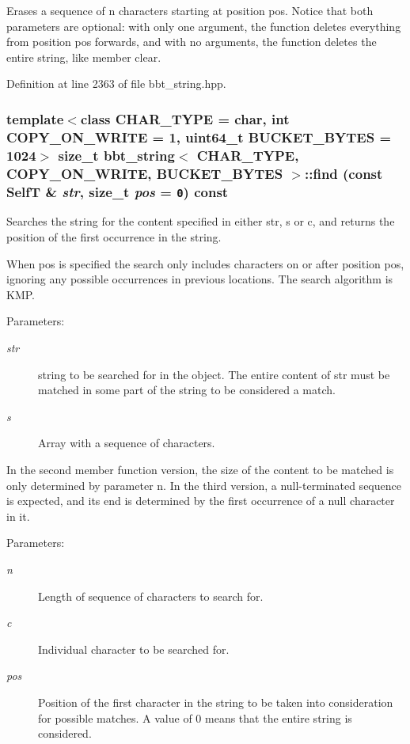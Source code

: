 Erases a sequence of n characters starting at position pos. Notice that both parameters are optional: with only one argument, the function deletes everything from position pos forwards, and with no arguments, the function deletes the entire string, like member clear. 

Definition at line 2363 of file bbt\_\-string.hpp.\hypertarget{classbbt__string_d4e8abb583695fb2be91eaee21827601}{
\subsubsection[{find}]{\setlength{\rightskip}{0pt plus 5cm}template$<$class CHAR\_\-TYPE  = char, int COPY\_\-ON\_\-WRITE = 1, uint64\_\-t BUCKET\_\-BYTES = 1024$>$ size\_\-t {\bf bbt\_\-string}$<$ CHAR\_\-TYPE, COPY\_\-ON\_\-WRITE, BUCKET\_\-BYTES $>$::find (const {\bf SelfT} \& {\em str}, \/  size\_\-t {\em pos} = {\tt 0}) const}}
\label{classbbt__string_d4e8abb583695fb2be91eaee21827601}


Searches the string for the content specified in either str, s or c, and returns the position of the first occurrence in the string.

When pos is specified the search only includes characters on or after position pos, ignoring any possible occurrences in previous locations. The search algorithm is KMP.

\begin{Desc}
\item[Parameters:]
\begin{description}
\item[{\em str}]string to be searched for in the object. The entire content of str must be matched in some part of the string to be considered a match. \item[{\em s}]Array with a sequence of characters.\end{description}
\end{Desc}
In the second member function version, the size of the content to be matched is only determined by parameter n. In the third version, a null-terminated sequence is expected, and its end is determined by the first occurrence of a null character in it.

\begin{Desc}
\item[Parameters:]
\begin{description}
\item[{\em n}]Length of sequence of characters to search for. \item[{\em c}]Individual character to be searched for. \item[{\em pos}]Position of the first character in the string to be taken into consideration for possible matches. A value of 0 means that the entire string is considered. \end{description}
\end{Desc}


